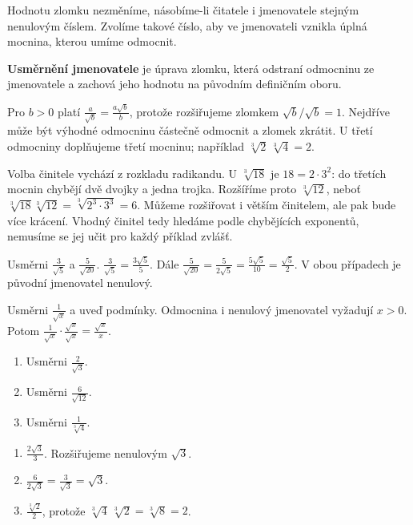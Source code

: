 \documentclass[11pt,a4paper]{article}
\begin{document}

Hodnotu zlomku nezměníme, násobíme-li čitatele i jmenovatele stejným nenulovým číslem. Zvolíme takové číslo, aby ve jmenovateli vznikla úplná mocnina, kterou umíme odmocnit.

\begin{definiceBox}[title={Definice},breakable=false]
\textbf{Usměrnění jmenovatele} je úprava zlomku, která odstraní odmocninu ze jmenovatele a zachová jeho hodnotu na původním definičním oboru.
\end{definiceBox}


Pro $b>0$ platí $\frac a{\sqrt b}=\frac{a\sqrt b}{b}$, protože rozšiřujeme zlomkem $\sqrt b/\sqrt b=1$. Nejdříve může být výhodné odmocninu částečně odmocnit a zlomek zkrátit. U třetí odmocniny doplňujeme třetí mocninu; například $\sqrt[3]2\,\sqrt[3]4=2$.

Volba činitele vychází z rozkladu radikandu. U $\sqrt[3]{18}$
je $18=2\cdot3^2$: do třetích mocnin chybějí dvě dvojky a jedna trojka.
Rozšíříme proto $\sqrt[3]{12}$, neboť
$\sqrt[3]{18}\sqrt[3]{12}=\sqrt[3]{2^3\cdot3^3}=6$.
Můžeme rozšiřovat i větším činitelem, ale pak bude více krácení.
Vhodný činitel tedy hledáme podle chybějících exponentů,
nemusíme se jej učit pro každý příklad zvlášť.


\begin{prikladReseniBox}[title={Příklad 1},breakable=false]
Usměrni $\frac3{\sqrt5}$ a $\frac5{\sqrt{20}}$.
\tcblower
$\frac3{\sqrt5}=\frac{3\sqrt5}{5}$. Dále $\frac5{\sqrt{20}}=\frac5{2\sqrt5}=\frac{5\sqrt5}{10}=\frac{\sqrt5}{2}$. V obou případech je původní jmenovatel nenulový.
\end{prikladReseniBox}


\begin{prikladReseniBox}[title={Příklad 2},breakable=false]
Usměrni $\frac1{\sqrt x}$ a uveď podmínky.
\tcblower
Odmocnina i nenulový jmenovatel vyžadují $x>0$. Potom $\frac1{\sqrt x}\cdot\frac{\sqrt x}{\sqrt x}=\frac{\sqrt x}{x}$.
\end{prikladReseniBox}



\begin{zadaniReseniBox}[title={Procvičení},breakable=false]
\begin{enumerate}[label=\alph*)]
\item Usměrni $\frac2{\sqrt3}$.
\item Usměrni $\frac6{\sqrt{12}}$.
\item Usměrni $\frac1{\sqrt[3]4}$.
\end{enumerate}
\tcblower
\begin{enumerate}[label=\alph*)]
\item $\frac{2\sqrt3}{3}$. Rozšiřujeme nenulovým $\sqrt3$.
\item $\frac6{2\sqrt3}=\frac3{\sqrt3}=\sqrt3$.
\item $\frac{\sqrt[3]2}{2}$, protože $\sqrt[3]4\,\sqrt[3]2=\sqrt[3]8=2$.
\end{enumerate}
\end{zadaniReseniBox}
\end{document}
